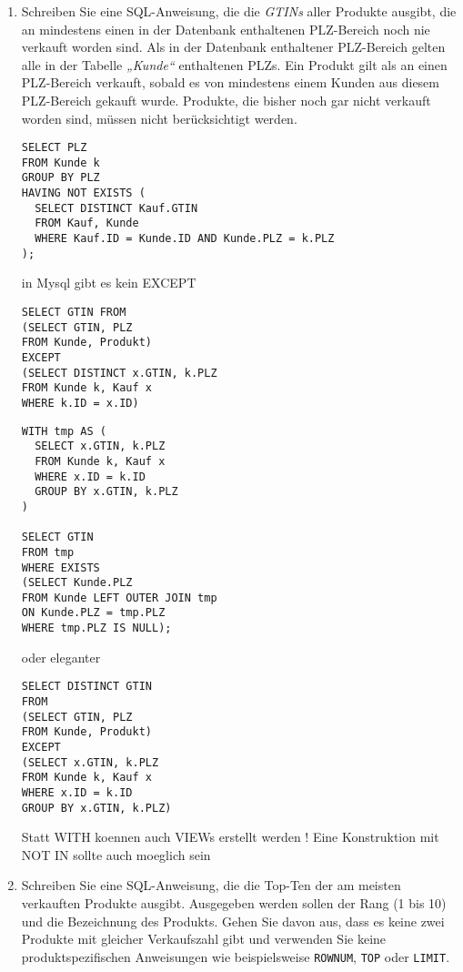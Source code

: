 \documentclass{lehramt-informatik-aufgabe}
\begin{document}
\begin{enumerate}

\item Schreiben Sie eine SQL-Anweisung, die die \emph{GTINs} aller
Produkte ausgibt, die an mindestens einen in der Datenbank enthaltenen
PLZ-Bereich noch nie verkauft worden sind. Als in der Datenbank
enthaltener PLZ-Bereich gelten alle in der Tabelle \emph{„Kunde“}
enthaltenen PLZs. Ein Produkt gilt als an einen PLZ-Bereich verkauft,
sobald es von mindestens einem Kunden aus diesem PLZ-Bereich gekauft
wurde. Produkte, die bisher noch gar nicht verkauft worden sind, müssen
nicht berücksichtigt werden.

\begin{verbatim}
SELECT PLZ
FROM Kunde k
GROUP BY PLZ
HAVING NOT EXISTS (
  SELECT DISTINCT Kauf.GTIN
  FROM Kauf, Kunde
  WHERE Kauf.ID = Kunde.ID AND Kunde.PLZ = k.PLZ
);
\end{verbatim}

\begin{liAntwort}
in Mysql gibt es kein EXCEPT

\begin{verbatim}
SELECT GTIN FROM
(SELECT GTIN, PLZ
FROM Kunde, Produkt)
EXCEPT
(SELECT DISTINCT x.GTIN, k.PLZ
FROM Kunde k, Kauf x
WHERE k.ID = x.ID)
\end{verbatim}
\end{liAntwort}

\begin{liAntwort}
\begin{verbatim}
WITH tmp AS (
  SELECT x.GTIN, k.PLZ
  FROM Kunde k, Kauf x
  WHERE x.ID = k.ID
  GROUP BY x.GTIN, k.PLZ
)

SELECT GTIN
FROM tmp
WHERE EXISTS
(SELECT Kunde.PLZ
FROM Kunde LEFT OUTER JOIN tmp
ON Kunde.PLZ = tmp.PLZ
WHERE tmp.PLZ IS NULL);
\end{verbatim}

oder eleganter

\begin{verbatim}
SELECT DISTINCT GTIN
FROM
(SELECT GTIN, PLZ
FROM Kunde, Produkt)
EXCEPT
(SELECT x.GTIN, k.PLZ
FROM Kunde k, Kauf x
WHERE x.ID = k.ID
GROUP BY x.GTIN, k.PLZ)
\end{verbatim}

Statt WITH koennen auch VIEWs erstellt werden !
Eine Konstruktion mit NOT IN sollte auch moeglich sein
\end{liAntwort}


\item Schreiben Sie eine SQL-Anweisung, die die Top-Ten der am meisten
verkauften Produkte ausgibt. Ausgegeben werden sollen der Rang (1 bis
10) und die Bezeichnung des Produkts. Gehen Sie davon aus, dass es keine
zwei Produkte mit gleicher Verkaufszahl gibt und verwenden Sie keine
produktspezifischen Anweisungen wie beispielsweise \verb|ROWNUM|,
\verb|TOP| oder \verb|LIMIT|.


\end{enumerate}
\end{document}
